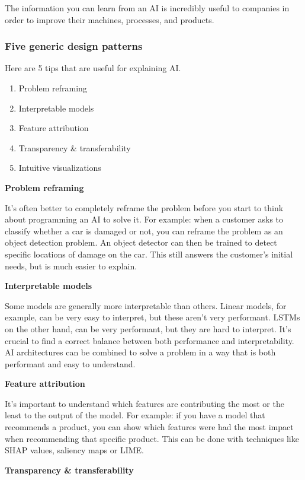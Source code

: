 \documentclass{article}
\begin{document}
The information you can learn from an AI is incredibly useful to companies in order
to improve their machines, processes, and products. 

\subsubsection{Five generic design patterns}

Here are 5 tips that are useful for explaining AI.

\begin{enumerate}
    \item Problem reframing
    \item Interpretable models
    \item Feature attribution
    \item Transparency \& transferability
    \item Intuitive visualizations
\end{enumerate}

\textbf{Problem reframing}

It's often better to completely reframe the problem before you start to think about
programming an AI to solve it. For example: when a customer asks to classify whether
a car is damaged or not, you can reframe the problem as an object detection problem.
An object detector can then be trained to detect specific locations of damage on the car.
This still answers the customer's initial needs, but is much easier to explain.

\textbf{Interpretable models}

Some models are generally more interpretable than others. Linear models, for example,
can be very easy to interpret, but these aren't very performant. LSTMs on the other hand,
can be very performant, but they are hard to interpret. It's crucial to find a correct
balance between both performance and interpretability. AI architectures can be combined
to solve a problem in a way that is both performant and easy to understand.

\textbf{Feature attribution}

It's important to understand which features are contributing the most or the least 
to the output of the model. For example: if you have a model that recommends a product,
you can show which features were had the most impact when recommending that specific product.
This can be done with techniques like SHAP values, saliency maps or LIME.

\textbf{Transparency \& transferability}
\end{document}
